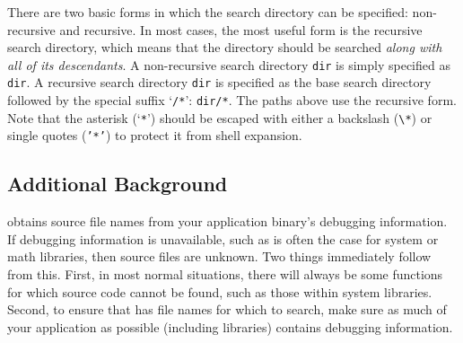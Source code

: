 \documentclass[11pt,letterpaper]{report}
\begin{document}
There are two basic forms in which the search directory can be specified: non-recursive and recursive.
In most cases, the most useful form is the recursive search directory, which means that the directory should be searched \emph{along with all of its descendants}.
A non-recursive search directory \texttt{dir} is simply specified as \texttt{dir}.
A recursive search directory \texttt{dir} is specified as the base search directory followed by the special suffix `\texttt{/*}': \texttt{dir/*}.
The paths above use the recursive form.
Note that the asterisk (`\texttt{*}') should be escaped with either a backslash (\verb|\*|) or single quotes (\texttt{'*'}) to protect it from shell expansion.



\subsection{Additional Background}

\hpcprofAll{} obtains source file names from your application binary's debugging information.
If debugging information is unavailable, such as is often the case for system or math libraries, then source files are unknown.
Two things immediately follow from this.
First, in most normal situations, there will always be some functions for which source code cannot be found, such as those within system libraries.
Second, to ensure that \hpcprofAll{} has file names for which to search, make sure as much of your application as possible (including libraries) contains debugging information.
\end{document}
